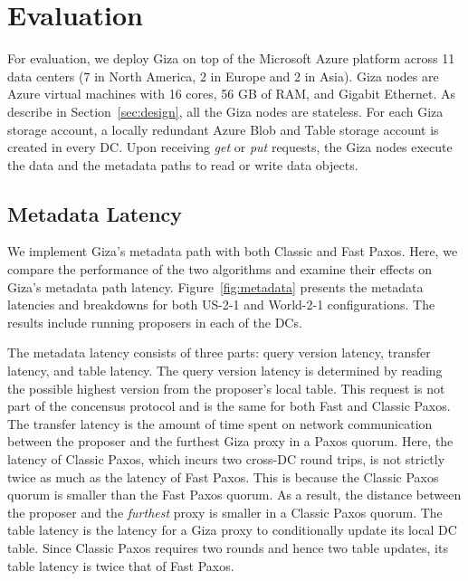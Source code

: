 \section{Evaluation}

For evaluation, we deploy Giza on top of the Microsoft Azure platform across 11 data centers (7 in North America, 2 in Europe and 2 in Asia). Giza nodes are Azure virtual machines with 16 cores, 56 GB of RAM, and Gigabit Ethernet. As describe in Section~\ref{sec:design}, all the Giza nodes are stateless. For each Giza storage account, a locally redundant Azure Blob and Table storage account is created in every DC. Upon receiving {\em get} or {\em put} requests, the Giza nodes execute the data and the metadata paths to read or write data objects.



\subsection{Metadata Latency}

We implement Giza's metadata path with both Classic and Fast Paxos. Here, we compare the performance of the two algorithms and examine their effects on Giza's metadata path latency. Figure~\ref{fig:metadata} presents the metadata latencies and breakdowns for both US-2-1 and World-2-1 configurations. The results include running proposers in each of the DCs.

The metadata latency consists of three parts: query version latency, transfer latency, and table latency.
The query version latency is determined by reading the possible highest version from the proposer’s local table. This request is not part of the concensus protocol and is the same for both Fast and Classic Paxos.
The transfer latency is the amount of time spent on network communication between the proposer and the furthest Giza proxy in a Paxos quorum. Here, the latency of Classic Paxos, which incurs two cross-DC round trips, is not strictly twice as much as the latency of Fast Paxos. This is because the Classic Paxos quorum is smaller than the Fast Paxos quorum. As a result, the distance between the proposer and the {\em furthest} proxy is smaller in a Classic Paxos quorum.
The table latency is the latency for a Giza proxy to conditionally update its local DC table. Since Classic Paxos requires two rounds and hence two table updates, its table latency is twice that of Fast Paxos.


